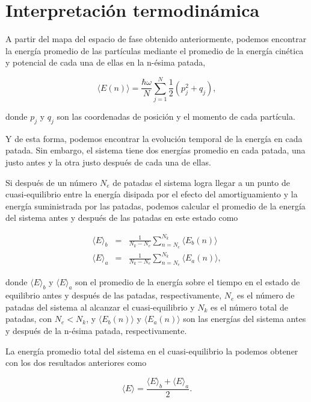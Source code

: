 \documentclass[letterpaper,12pt,oneside]{book}
\begin{document}
	\section{Interpretaci\'on termodin\'amica}
	
	A partir del mapa del espacio de fase obtenido anteriormente, podemos encontrar la energía promedio de las partículas mediante el promedio de la energía cinética y potencial de cada una de ellas en la n-ésima patada,
	
	\begin{equation}
	\langle E(n) \rangle = \frac{\hbar\omega}{N}\sum_{j=1}^{N}\frac{1}{2} \left(p_j^2 + q_j\right),
	\end{equation}
	
	\noindent donde $p_j$ y $q_j$ son las coordenadas de posición y el momento de cada partícula.
	
	
	Y de esta forma, podemos encontrar la evolución temporal de la energía en cada patada. Sin embargo, el sistema tiene dos energías promedio en cada patada, una justo antes y la otra justo después de cada una de ellas.
	
	Si después de un número $N_e$ de patadas el sistema logra llegar a un punto de cuasi-equilibrio entre la energía disipada por el efecto del amortiguamiento y la energía suministrada por las patadas, podemos calcular el promedio de la energía del sistema antes y después de las patadas en este estado como
	
	\begin{eqnarray}
	\langle E \rangle_b &=& \frac{1}{N_k - N_e} \sum_{n = N_e}^{N_k}  \langle E_b(n)\rangle \label{Eq.MHBefore}\\ 
	\langle E \rangle_a &=& \frac{1}{N_k - N_e} \sum_{n = N_e}^{N_k}  \langle E_a(n) \rangle , \label{Eq.MHafter}
	\end{eqnarray}
	
	\noindent donde $\langle E \rangle_b$ y $ \langle E \rangle_a $ son el promedio de la energía sobre el tiempo en el estado de equilibrio antes y después de las patadas, respectivamente, $N_e$ es el número de patadas del sistema al alcanzar el cuasi-equilibrio y $N_k$ es el número total de patadas, con $N_e<N_k$, y $\langle E_b(n) \rangle$ y $\langle E_a(n) \rangle$ son las energías del sistema antes y después de la n-ésima patada, respectivamente.
	
	La energía promedio total del sistema en el cuasi-equilibrio la podemos obtener con los dos resultados anteriores como
	
	\begin{equation}\label{Eq.MeanET}
	\langle E \rangle = \frac{\langle E \rangle_b + \langle E \rangle_a}{2}.
	\end{equation}
	
\end{document}
